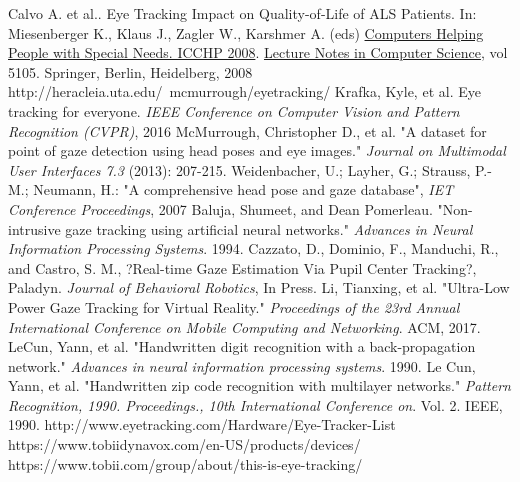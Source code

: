 \documentclass[10pt,twocolumn,letterpaper]{article}
\begin{document}
{\small


\begin{thebibliography}{1}
  Calvo A. et al.. Eye Tracking Impact on Quality-of-Life of ALS
  Patients. In: Miesenberger K., Klaus J., Zagler W., Karshmer
  A. (eds) \underline{Computers Helping People with Special Needs. ICCHP
    2008}. \underline{Lecture Notes in Computer Science}, vol 5105. Springer,
  Berlin, Heidelberg, 2008
  http://heracleia.uta.edu/~mcmurrough/eyetracking/
  Krafka, Kyle, et al. Eye tracking for everyone.
  \textit{IEEE Conference on Computer Vision and Pattern Recognition
    (CVPR)}, 2016
  McMurrough, Christopher D., et al. "A dataset for point of gaze
  detection using head poses and eye images."
  \textit{Journal on Multimodal User Interfaces 7.3} (2013): 207-215.
  Weidenbacher, U.; Layher, G.; Strauss, P.-M.; Neumann, H.: "A
  comprehensive head pose and gaze database",
  \textit{IET Conference Proceedings}, 2007
  Baluja, Shumeet, and Dean Pomerleau. "Non-intrusive gaze tracking
  using artificial neural networks." \textit{Advances in Neural
    Information Processing Systems}. 1994.
  Cazzato, D., Dominio, F., Manduchi, R., and Castro, S. M.,
  ?Real-time Gaze Estimation Via Pupil Center Tracking?,
  Paladyn. \textit{Journal of Behavioral Robotics}, In Press.
  Li, Tianxing, et al. "Ultra-Low Power Gaze Tracking for Virtual
  Reality." \textit{Proceedings of the 23rd Annual International
    Conference on Mobile Computing and Networking}. ACM, 2017.
  LeCun, Yann, et al. "Handwritten digit recognition with a
  back-propagation network." \textit{Advances in neural information
    processing systems}. 1990.
  Le Cun, Yann, et al. "Handwritten zip code recognition with
  multilayer networks." \textit{Pattern Recognition,
    1990. Proceedings., 10th International Conference
    on}. Vol. 2. IEEE, 1990.
  http://www.eyetracking.com/Hardware/Eye-Tracker-List
  https://www.tobiidynavox.com/en-US/products/devices/
  https://www.tobii.com/group/about/this-is-eye-tracking/

\end{thebibliography}
}
\end{document}
